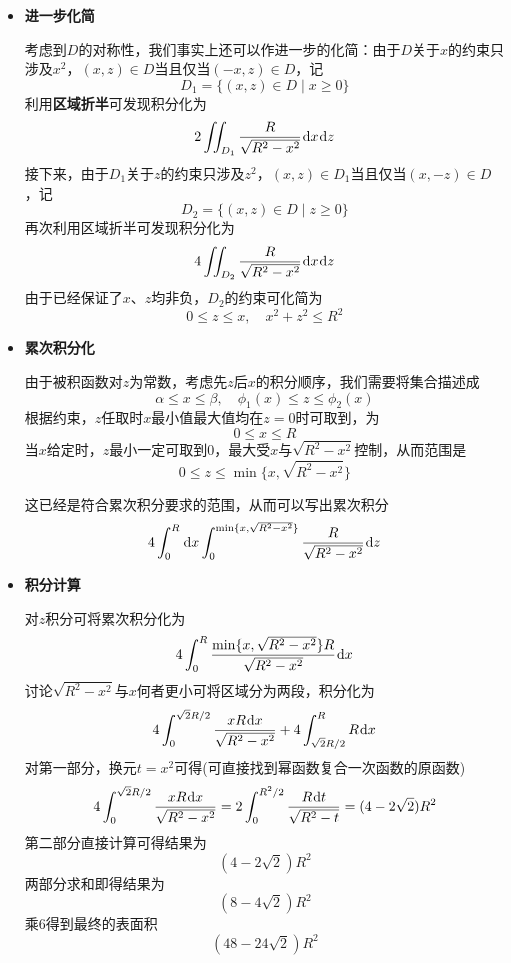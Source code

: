 \documentclass[a4paper,UTF8,fontset=windows,AutoFakeBold]{ctexart}
\newcommand*{\dr}{\hspace{0.07em}\mathrm{d}}
\theoremstyle{ex}
\begin{document}
\begin{framed}
{\begin{itemize}
        \item \textbf{进一步化简}
        
        考虑到$D$的对称性，我们事实上还可以作进一步的化简：由于$D$关于$x$的约束只涉及$x^2$，$(x,z)\in D$当且仅当$(-x,z)\in D$，记
        $$D_1=\{(x,z)\in D\mid x\ge0\}$$
        利用\textbf{区域折半}可发现积分化为
        $$2\iint_{D_1}\frac{R}{\sqrt{R^2-x^2}}\dr x\dr z$$
        接下来，由于$D_1$关于$z$的约束只涉及$z^2$，$(x,z)\in D_1$当且仅当$(x,-z)\in D$，记
        $$D_2=\{(x,z)\in D\mid z\ge0\}$$
        再次利用区域折半可发现积分化为
        $$4\iint_{D_2}\frac{R}{\sqrt{R^2-x^2}}\dr x\dr z$$
        由于已经保证了$x$、$z$均非负，$D_2$的约束可化简为
        $$0\le z\le x,\quad x^2+z^2\le R^2$$

        \item \textbf{累次积分化}
        
        由于被积函数对$z$为常数，考虑先$z$后$x$的积分顺序，我们需要将集合描述成
        $$\alpha\le x\le\beta,\quad \phi_1(x)\le z\le\phi_2(x)$$
        根据约束，$z$任取时$x$最小值最大值均在$z=0$时可取到，为
        $$0\le x\le R$$
        当$x$给定时，$z$最小一定可取到0，最大受$x$与$\sqrt{R^2-x^2}$控制，从而范围是
        $$0\le z\le\min\{x,\sqrt{R^2-x^2}\}$$

        这已经是符合累次积分要求的范围，从而可以写出累次积分
        $$4\int_0^R\dr x\int_0^{\min\{x,\sqrt{R^2-x^2}\}}\frac{R}{\sqrt{R^2-x^2}}\dr z$$
    
        \item \textbf{积分计算}
        
        对$z$积分可将累次积分化为
        $$4\int_0^R\frac{\min\{x,\sqrt{R^2-x^2}\}R}{\sqrt{R^2-x^2}}\dr x$$
        讨论$\sqrt{R^2-x^2}$与$x$何者更小可将区域分为两段，积分化为
        $$4\int_0^{\sqrt2R/2}\frac{xR\dr x}{\sqrt{R^2-x^2}}+4\int_{\sqrt2R/2}^RR\dr x$$
        对第一部分，换元$t=x^2$可得(可直接找到幂函数复合一次函数的原函数)
        $$4\int_0^{\sqrt2R/2}\frac{xR\dr x}{\sqrt{R^2-x^2}}=2\int_0^{R^2/2}\frac{R\dr t}{\sqrt{R^2-t}}=(4-2\sqrt2)R^2$$
        第二部分直接计算可得结果为
        $$(4-2\sqrt2)R^2$$
        两部分求和即得结果为
        $$(8-4\sqrt2)R^2$$
        乘6得到最终的表面积
        $$(48-24\sqrt2)R^2$$
    \end{itemize}
}
\end{framed}
\end{document}
